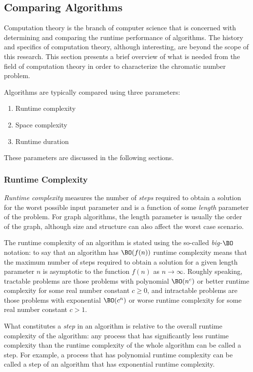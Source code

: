 \subsection{Comparing Algorithms}\label{sec:sub:compare}

Computation theory is the branch of computer science that is concerned with determining and comparing the runtime
performance of algorithms.  The history and specifics of computation theory, although interesting, are beyond the
scope of this research.  This section presents a brief overview of what is needed from the field of computation
theory in order to characterize the chromatic number problem.

Algorithms are typically compared using three parameters:
\begin{enumerate}
\item Runtime complexity
\item Space complexity
\item Runtime duration
\end{enumerate}

These parameters are discussed in the following sections.

\subsubsection{Runtime Complexity}\label{sec:sub:sub:runtime}

\emph{Runtime complexity} measures the number of \emph{steps} required to obtain a solution for the worst possible
input parameter and is a function of some \emph{length} parameter of the problem.  For graph algorithms, the length
parameter is usually the order of the graph, although size and structure can also affect the worst case scenario.

The runtime complexity of an algorithm is stated using the so-called \emph{big-\(\BO\)} notation: to say that an
algorithm has \(\BO(f(n))\) runtime complexity means that the maximum number of steps required to obtain a solution
for a given length parameter \(n\) is asymptotic to the function \(f(n)\) as \(n\to\infty\).  Roughly speaking,
tractable problems are those problems with polynomial \(\BO(n^c)\) or better runtime complexity for some real
number constant \(c\ge0\), and intractable problems are those problems with exponential \(\BO(c^n)\) or worse
runtime complexity for some real number constant \(c>1\).

What constitutes a \emph{step} in an algorithm is relative to the overall runtime complexity of the algorithm: any
process that has significantly less runtime complexity than the runtime complexity of the whole algorithm can be
called a step.  For example, a process that has polynomial runtime complexity can be called a step of an algorithm
that has exponential runtime complexity.

